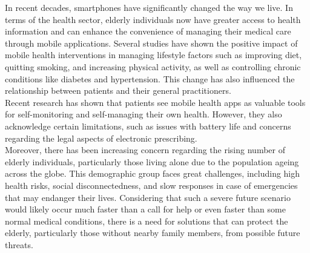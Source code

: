 In recent decades, smartphones have significantly changed the way we live. In terms of the health sector, elderly individuals now have greater access to health information and can enhance the convenience of managing their medical care through mobile applications. Several studies have shown the positive impact of mobile health interventions in managing lifestyle factors such as improving diet, quitting smoking, and increasing physical activity, as well as controlling chronic conditions like diabetes and hypertension. This change has also influenced the relationship between patients and their general practitioners.\\
Recent research has shown that patients see mobile health apps as valuable tools for self-monitoring and self-managing their own health. However, they also acknowledge certain limitations, such as issues with battery life and concerns regarding the legal aspects of electronic prescribing.\\
Moreover, there has been increasing concern regarding the rising number of elderly individuals, particularly those living alone due to the population ageing across the globe. This demographic group faces great challenges, including high health risks, social disconnectedness, and slow responses in case of emergencies that may endanger their lives. Considering that such a severe future scenario would likely occur much faster than a call for help or even faster than some normal medical conditions, there is a need for solutions that can protect the elderly, particularly those without nearby family members, from possible future threats.
